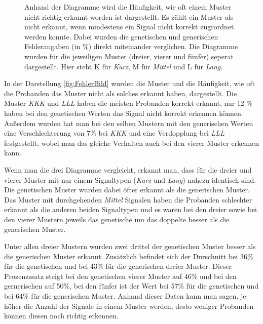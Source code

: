 \begin{figure}[htbp]
\begin{minipage}[t]{0.8\textwidth}
	\end{minipage}
	\caption{Anhand der Diagramme wird die H{\"a}ufigkeit, wie oft einem Muster nicht richtig erkannt worden ist dargestellt. Es z{\"a}hlt ein Muster als nicht erkannt, wenn mindestens ein Signal nicht korrekt zugrordnet werden konnte.   
	Dabei wurden die genetischen und generischen Fehlerangaben (in \%) direkt miteinander verglichen. 
	Die Diagramme wurden f{\"u}r die jeweiligen Muster (dreier, vierer und f{\"u}nfer) seperat dargestellt.
	Hier steht K f{\"u}r \textit{Kurz}, M f{\"u}r \textit{Mittel} und L f{\"u}r \textit{Lang}.}
	\label{fig:FehlerBild}
\end{figure}
 
In der Darstellung \autoref{fig:FehlerBild} wurden die Muster und die H{\"a}ufigkeit, wie oft die Probanden das Muster nicht als solches erkannt haben, dargestellt. 
Die Muster \textit{KKK} und \textit{LLL} haben die meisten Probanden korrekt erkannt, nur 12 \% haben bei den genetischen Werten das Signal nicht korrekt erkennen k{\"o}nnen. 
Au{\ss}erdem wurden hat man bei den selben Mustern mit den generischen Werten eine Verschlechterung von 7\% bei \textit{KKK} und eine Verdopplung bei \textit{LLL} festgestellt, wobei man das gleiche Verhalten auch bei den vierer Muster erkennen kann.

Wenn man die drei Diagramme vergleicht, erkannt man, dass f{\"u}r die dreier und vierer Muster mit nur einem Signaltypen (\textit{Kurz} und \textit{Lang}) nahezu identisch sind.
Die genetischen Muster wurden dabei {\"o}fter erkannt als die generischen Muster. 
Das Muster mit durchgehenden \textit{Mittel} Signalen haben die Probanden schlechter erkannt als die anderen beiden Signaltypen und es waren bei den dreier sowie bei den vierer Mustern jeweils das genetische um das doppelte besser als die generischen Muster.

Unter allen dreier Mustern wurden zwei drittel der genetischen Muster besser als die generischen Muster erkannt. 
Zus{\"a}tzlich befindet sich der Durschnitt bei 36\% f{\"u}r die genetischen und bei 43\% f{\"u}r die generischen dreier Muster.
Dieser Prozenzssatz steigt bei den genetischen vierer Muster auf 46\% und bei den gernerischen auf 50\%, bei den f{\"u}nfer ist der Wert bei 57\% f{\"u}r die genetischen und bei 64\% f{\"u}r die generischen Muster. 
Anhand dieser Daten kann man sagen, je h{\"o}her die Anzahl der Signale in einem Muster werden, desto weniger Probanden k{\"o}nnen diesen noch richtig erkennen.

